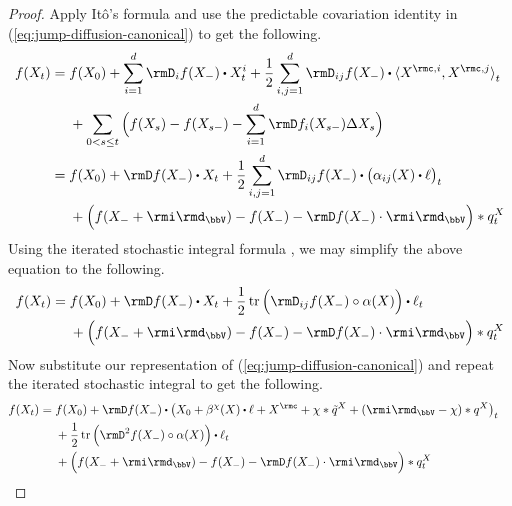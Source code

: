 \begin{proof}
  \label{proof:lemma:ito}
  Apply It\^o's formula \cite[Theorem I.4.57]{jacod2003} and use the predictable covariation identity in (\ref{eq:jump-diffusion-canonical}) to get the following.
  \begin{align*}
    f(\X_t) 
    &= \begin{aligned}[t]
      &f(\X_0) + \sum_{i=1}^d \Der_i f(\X_-) \shortInt \X^i_t + \frac12\sum_{i,j=1}^d \Der_{ij} f(\X_-) \shortInt \prj{\X^{\rmc,i}}{\X^{\rmc,j}}_t \\
      &+ \sum_{0<s\leq t} \Big( f(\X_s) - f(\X_{s-}) - \sum_{i=1}^d \Der f_i(\X_{s-}) \Delta\X_s \Big)
    \end{aligned} \\
    &= \begin{aligned}[t]
      &f(\X_0) + \Der f(\X_-) \shortInt \X_t + \frac12\sum_{i,j=1}^d \Der_{ij} f(\X_-) \shortInt \big(\affDiff_{ij}(\X) \shortInt \leb\big)_t \\
      &+ \Big( f(\X_-+\id_\vecSpace) - f(\X_-) - \Der f(\X_-) \cdot \id_\vecSpace \Big) \ast \jumpMeas^\X_t
    \end{aligned}
  \end{align*}
  Using the iterated stochastic integral formula \cite[Remark I.4.37]{jacod2003}, we may simplify the above equation to the following.
  \begin{equation*}
    f(\X_t) = \begin{aligned}[t]
      &f(\X_0) + \Der f(\X_-) \shortInt \X_t + \frac12 \tr \Big( \Der_{ij} f(\X_-) \circ \affDiff(\X) \Big) \shortInt \leb_t \\
      &+ \Big( f(\X_-+\id_\vecSpace) - f(\X_-) - \Der f(\X_-) \cdot \id_\vecSpace \Big) \ast \jumpMeas^\X_t
    \end{aligned}
  \end{equation*}
  Now substitute our representation of (\ref{eq:jump-diffusion-canonical}) and repeat the iterated stochastic integral to get the following.
  \begin{align*}
    f(\X_t)
    &= \begin{aligned}[t]
      &f(\X_0) 
      + \Der f(\X_-) \shortInt \big( \X_0 + \affDrift^\trunc(\X) \shortInt \leb + \X^\rmc + \trunc \ast \compensate{\jumpMeas^\X} + (\id_\vecSpace-\trunc) \ast \jumpMeas^\X \big)_t \\
      &+ \frac12 \tr\Big( \Hess f(\X_-) \circ \affDiff(\X) \Big)  \shortInt \leb_t  \\
      &+ \Big( f(\X_-+\id_\vecSpace) - f(\X_-) - \Der f(\X_-) \cdot \id_\vecSpace \Big) \ast \jumpMeas^\X_t

\end{aligned}
\end{align*}
\end{proof}
